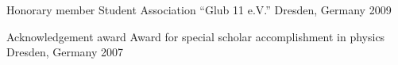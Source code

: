 
\begin{cvhonors}
  \cvhonor
    {Honorary member} %
    {Student Association ``Glub 11 e.V.''} %
    {Dresden, Germany} %
    {2009} %

  \cvhonor
    {Acknowledgement award} %
    {Award for special scholar accomplishment in physics} %
    {Dresden, Germany} %
    {2007} %

\end{cvhonors}